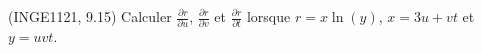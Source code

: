 
\begin{exercice}\label{exoDerrivePartielle-0004}

	(INGE1121, 9.15) Calculer $\frac{ \partial r }{ \partial u }$, $\frac{ \partial r }{ \partial v }$ et $\frac{ \partial r }{ \partial t }$ lorsque $r=x\ln(y)$, $x=3u+vt$ et $y=uvt$.

\end{exercice}
